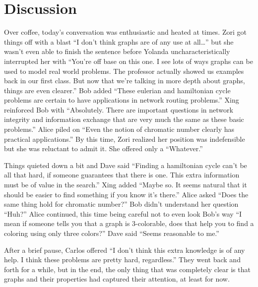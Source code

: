 \section{Discussion}\label{s:graphs:discussion}

Over coffee, today's conversation was enthusiastic and heated at
times. Zori got things off with a blast ``I don't think graphs
are of any use at all\dots'' but she wasn't even able to finish
the sentence before Yolanda  uncharacteristically interrupted her with
``You're off base on this one.  I see lots of ways graphs can
be used to model real world problems.  The professor actually
showed us examples back in our first class.  But now that we're
talking in more depth about graphs, things are even clearer.''
Bob added ``These eulerian and hamiltonian cycle problems are
certain to have applications in network routing problems.''
Xing reinforced Bob with ``Absolutely.  There are important
questions in network integrity and information exchange that
are very much the same as these basic problems.'' Alice piled
on ``Even the notion of chromatic number clearly has practical
applications.''  By this time, Zori realized her position was
indefensible but she was reluctant to admit it.  She offered
only a ``Whatever.''

Things quieted down a bit and Dave said ``Finding a hamiltonian
cycle can't be all that hard, if someone guarantees that there
is one.  This extra information must be of value in the search.''
Xing added ``Maybe so.  It seems natural that it should be
easier to find something if you know it's there.''  Alice
asked ``Does the same thing hold for chromatic number?''  Bob
didn't understand her question ``Huh?''  Alice continued,
this time being careful not to even look Bob's way ``I mean
if someone tells you that a graph is $3$-colorable, does that
help you to find a coloring using only three colors?''  Dave
said ``Seems reasonable to me.''

After a brief pause, Carlos offered ``I don't think this extra
knowledge is of any help. I think these problems are pretty hard,
regardless.''  They went back and forth for a while, but in the
end, the only thing that was completely clear is that graphs
and their properties had captured their attention, at least for
now.

